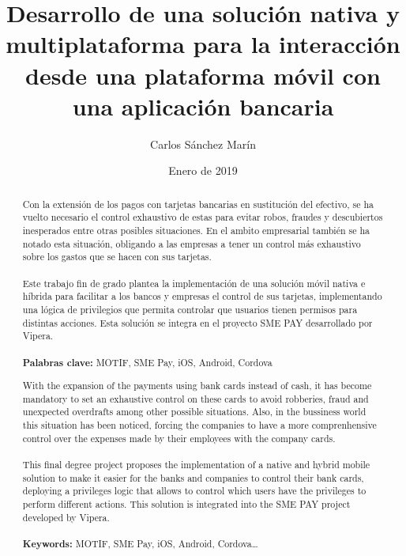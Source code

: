 \documentclass[a4paper, 12pt]{article}
\author{Carlos Sánchez Marín}
\date{Enero de 2019}
\title{Desarrollo de una solución nativa y multiplataforma para la interacción desde una plataforma móvil con una aplicación bancaria}
\begin{document}
\maketitle
\begin{export}
\null
\newpage

\tableofcontents
\newpage

\listoffigures
\listoflistings
\newpage
\end{export}

\begin{abstract}
\normalsize
Con la extensión de los pagos con tarjetas bancarias en sustitución del efectivo, se ha vuelto necesario el control exhaustivo de estas para evitar
robos, fraudes y descubiertos inesperados entre otras posibles situaciones. En el ambito empresarial también se ha notado esta situación, obligando a
las empresas a tener un control más exhaustivo sobre los gastos que se hacen con sus tarjetas.
\\
\\
Este trabajo fin de grado plantea la implementación de una solución móvil nativa e híbrida para facilitar a los bancos y empresas el control de sus tarjetas,
implementando una lógica de privilegios que permita controlar que usuarios tienen permisos para distintas acciones. Esta solución se integra en el proyecto SME PAY
desarrollado por Vipera.
\\
\\
\textbf{Palabras clave:} MOTIF, SME Pay, iOS, Android, Cordova
\end{abstract}
\break
\begin{otherlanguage}{english}
\begin{abstract}
\normalsize
With the expansion of the payments using bank cards instead of cash, it has become mandatory to set an exhaustive control on these cards to avoid robberies, fraud and unexpected
overdrafts among other possible situations. Also, in the bussiness world this situation has been noticed, forcing the companies to have a more comprenhensive control over the expenses made by
their employees with the company cards.
\\
\\
This final degree project proposes the implementation of a native and hybrid mobile solution to make it easier for the banks and companies to control their bank cards, deploying a privileges logic that allows to control which users have the privileges to perform different actions. This solution is integrated into the SME PAY project developed by Vipera.
\\
\\
\textbf{Keywords:} MOTIF, SME Pay, iOS, Android, Cordova\ldots
\end{abstract}
\end{otherlanguage}
\end{document}
